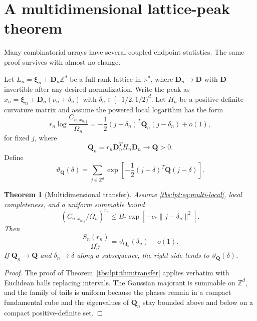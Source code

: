 \documentclass[11pt,a4paper]{article}
\numberwithin{equation}{section}
\newtheorem{theorem}{Theorem}[section]
\theoremstyle{definition}
\newcommand{\Z}{\mathbb Z}
\newcommand{\R}{\mathbb R}
\begin{document}
\section{A multidimensional lattice-peak theorem}\label{tbs:lpt:sec:multi}

Many combinatorial arrays have several coupled endpoint statistics. The
same proof survives with almost no change.

Let $L_n=\boldsymbol\xi_n+\mathbf D_n\Z^d$ be a full-rank lattice in
$\R^d$, where $\mathbf D_n\to\mathbf D$ with $\mathbf D$ invertible after
any desired normalization. Write the peak as
$x_n=\boldsymbol\xi_n+\mathbf D_n(\nu_n+\delta_n)$ with
$\delta_n\in[-1/2,1/2)^d$. Let $H_n$ be a positive-definite curvature
matrix and assume the powered local logarithm has the form
\begin{equation}\label{tbs:lpt:eq:multi-local}
 r_n\log\frac{C_{n,x_{n,j}}}{\Omega_n}
 =-\frac12(j-\delta_n)^T\mathbf Q_n(j-\delta_n)+o(1),
\end{equation}
for fixed $j$, where
\[
 \mathbf Q_n=r_n \mathbf D_n^T H_n \mathbf D_n\longrightarrow\mathbf Q>0.
\]
Define
\begin{equation}\label{tbs:lpt:eq:multi-theta}
 \vartheta_{\mathbf Q}(\delta)=\sum_{j\in\Z^d}
 \exp\!\left[-\frac12(j-\delta)^T\mathbf Q(j-\delta)\right].
\end{equation}

\begin{theorem}[Multidimensional transfer]\label{tbs:lpt:thm:multi}
Assume \eqref{tbs:lpt:eq:multi-local}, local completeness, and a uniform
summable bound
\[
 \left(C_{n,x_{n,j}}/\Omega_n\right)^{r_n}
 \le B_*\exp[-c_*\|j-\delta_n\|^2].
\]
Then
\begin{equation}\label{tbs:lpt:eq:multi-main}
 \frac{S_n(r_n)}{\Omega_n^{r_n}}
 =\vartheta_{\mathbf Q_n}(\delta_n)+o(1).
\end{equation}
If $\mathbf Q_n\to\mathbf Q$ and $\delta_n\to\delta$ along a subsequence,
the right side tends to $\vartheta_{\mathbf Q}(\delta)$.
\end{theorem}

\begin{proof}
The proof of Theorem~\ref{tbs:lpt:thm:transfer} applies verbatim with
Euclidean balls replacing intervals. The Gaussian majorant is summable on
$\Z^d$, and the family of tails is uniform because the phases remain in a
compact fundamental cube and the eigenvalues of $\mathbf Q_n$ stay
bounded above and below on a compact positive-definite set.
\end{proof}
\end{document}
